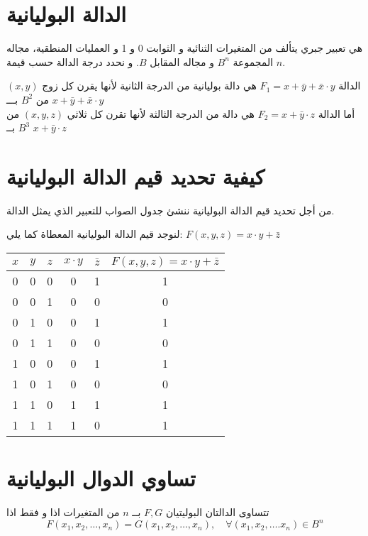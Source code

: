 \section*{الدالة البوليانية} 
هي تعبير جبري يتألف من المتغيرات الثنائية و الثوابت 0 و 1 و العمليات المنطقية، مجاله المجموعة $B^n$ و مجاله المقابل $B$. و نحدد درجة الدالة حسب قيمة $n$.

\begin{example}
	الدالة
	$F_1 = x + \bar{y} + \bar{x}\cdot y$
	هي دالة بوليانية من الدرجة الثانية لأنها يقرن كل زوج $(x,y)$ من $B^2$ بـــ $x + \bar{y} + \bar{x}\cdot y$\\
	أما الدالة
	$F_2 = x + \bar{y}\cdot z$
	هي دالة من الدرجة الثالثة لأنها تقرن كل ثلاثي $(x,y,z)$ من $B^3$ بــ $x + \bar{y}\cdot z$
\end{example}


\section{كيفية تحديد قيم الدالة البوليانية}
من أجل تحديد قيم الدالة البوليانية ننشئ جدول الصواب للتعبير الذي يمثل الدالة.
\begin{example}
	لنوجد قيم الدالة البوليانية المعطاة كما يلي: $F(x,y,z) = x\cdot y + \bar{z}$
	\begin{english}
		\begin{table}[H]
			\centering
			\renewcommand{\arraystretch}{1.3}
			\begin{tabular}{|c|c|c|c|c|c|}
				\hline
				$x$ & $y$ & $z$ & $x\cdot y$ & $\bar{z}$ & $F(x,y,z) = x\cdot y + \bar{z}$\\
				\hline
				0 &0& 0& 0& 1& 1\\
				\hline
				0 &0& 1& 0& 0& 0\\
				\hline
				0&1&0&0&1&1\\
				\hline
				0&1&1&0&0&0\\
				\hline
				1&0&0&0&1&1\\
				\hline
				1&0&1&0&0&0\\
				\hline
				1&1&0&1&1&1\\
				\hline
				1&1&1&1&0&1\\
				\hline  
			\end{tabular}
		\end{table}
	\end{english}
\end{example}

\section*{تساوي الدوال البوليانية}
تتساوى الدالتان البوليتيان $F,G$ بــ $n$ من المتغيرات اذا و فقط اذا
\[
F(x_1, x_2, \dots, x_n) = G(x_1,x_2, \dots, x_n), \quad \forall (x_1, x_2,\dots. x_n) \in B^n
\]

